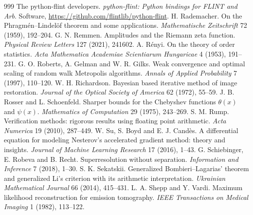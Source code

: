 \begin{thebibliography}{999}
 The python-flint developers. \emph{python-flint: Python bindings for FLINT and Arb}. Software, \url{https://github.com/flintlib/python-flint}.
 H. Rademacher. On the Phragm\'en--Lindel\"of theorem and some applications. \emph{Mathematische Zeitschrift} 72 (1959), 192--204.
 G. N. Remmen. Amplitudes and the Riemann zeta function. \emph{Physical Review Letters} 127 (2021), 241602. %
 A. R\'enyi. On the theory of order statistics. \emph{Acta Mathematica Academiae Scientiarum Hungaricae} 4 (1953), 191--231.
 G. O. Roberts, A. Gelman and W. R. Gilks. Weak convergence and optimal scaling of random walk Metropolis algorithms. \emph{Annals of Applied Probability} 7 (1997), 110--120.
 W. H. Richardson. Bayesian based iterative method of image restoration. \emph{Journal of the Optical Society of America} 62 (1972), 55--59.
 J. B. Rosser and L. Schoenfeld. Sharper bounds for the Chebyshev functions $\theta(x)$ and $\psi(x)$. \emph{Mathematics of Computation} 29 (1975), 243--269.
 S. M. Rump. Verification methods: rigorous results using floating point arithmetic. \emph{Acta Numerica} 19 (2010), 287--449.
 W. Su, S. Boyd and E. J. Cand\`es. A differential equation for modeling Nesterov's accelerated gradient method: theory and insights. \emph{Journal of Machine Learning Research} 17 (2016), 1--43.
 G. Schiebinger, E. Robeva and B. Recht. Superresolution without separation. \emph{Information and Inference} 7 (2018), 1--30.
 S. K. Sekatskii. Generalized Bombieri--Lagarias' theorem and generalized Li's criterion with its arithmetic interpretation. \emph{Ukrainian Mathematical Journal} 66 (2014), 415--431.
 L. A. Shepp and Y. Vardi. Maximum likelihood reconstruction for emission tomography. \emph{IEEE Transactions on Medical Imaging} 1 (1982), 113--122.

\end{thebibliography}

